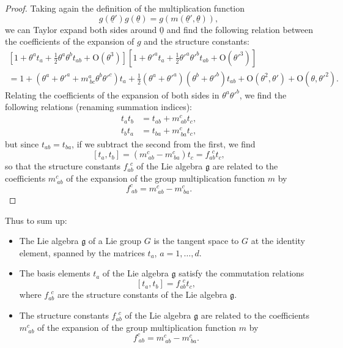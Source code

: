 \begin{proof}
    Taking again the definition of the multiplication function
    \[
        g(\underline{\theta}') g(\underline{\theta}) = g(m(\underline{\theta}', \underline{\theta})),
    \]
    we can Taylor expand both sides around \(\underline{0}\) and find the following relation between the coefficients of the expansion of \(g\) and the structure constants:
    \[
        \begin{aligned}
            \left[ 1 + \theta^a t_a + \frac{1}{2} \theta^a \theta^b t_{ab} + \mathrm{O}(\theta^3) \right] \left[ 1 + \theta'^a t_a + \frac{1}{2} \theta'^a \theta'^b t_{ab} + \mathrm{O}(\theta'^3) \right] \\
            = 1 + \left( \theta^a + \theta'^a + m^a_{\ bc} \theta^b \theta'^c \right) t_a + \frac{1}{2} \left( \theta^a + \theta'^a \right)\left( \theta^b + \theta'^b \right) t_{ab} + \mathrm{O}(\theta^2, \theta') + \mathrm{O}(\theta, \theta'^2).
        \end{aligned}
    \]
    Relating the coefficients of the expansion of both sides in \(\theta^a \theta'^b\), we find the following relations (renaming summation indices):
    \[
        \begin{aligned}
            t_a t_b & = t_{ab} + m^c_{\ ab} t_c, \\
            t_b t_a & = t_{ba} + m^c_{\ ba} t_c,
        \end{aligned}
    \]
    but since \(t_{ab} = t_{ba}\), if we subtract the second from the first, we find
    \[
        [t_a, t_b] = (m^c_{\ ab} - m^c_{\ ba}) t_c = f_{ab}^{\ \ c} t_c,
    \]
    so that the structure constants \(f_{ab}^{\ \ c}\) of the Lie algebra \(\mathfrak{g}\) are related to the coefficients \(m^c_{\ ab}\) of the expansion of the group multiplication function \(m\) by
    \[
        f_{\ ab}^{c} = m^c_{\ ab} - m^c_{\ ba}.
    \]
\end{proof}

Thus to sum up:
\begin{itemize}
    \item The Lie algebra \(\mathfrak{g}\) of a Lie group \(G\) is the tangent space to \(G\) at the identity element, spanned by the matrices \(t_a\), \(a = 1, \ldots, d\).
    \item The basis elements \(t_a\) of the Lie algebra \(\mathfrak{g}\) satisfy the commutation relations
          \[
              [t_a, t_b] = f_{ab}^{\ \ c} t_c,
          \]
          where \(f_{ab}^{\ \ c}\) are the structure constants of the Lie algebra \(\mathfrak{g}\).
    \item The structure constants \(f_{ab}^{\ \ c}\) of the Lie algebra \(\mathfrak{g}\) are related to the coefficients \(m^c_{\ ab}\) of the expansion of the group multiplication function \(m\) by
          \[
              f_{\ ab}^{c} = m^c_{\ ab} - m^c_{\ ba}.
          \]
\end{itemize}

